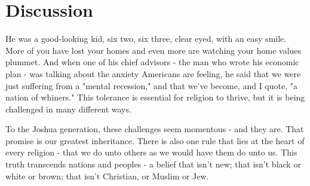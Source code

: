 \section{Discussion} \label{sec_discussion}

He was a good-looking kid, six two, six three, clear eyed, with an easy smile. More of you have lost your homes and even more are watching your home values plummet. And when one of his chief advisors - the man who wrote his economic plan - was talking about the anxiety Americans are feeling, he said that we were just suffering from a "mental recession," and that we've become, and I quote, "a nation of whiners." This tolerance is essential for religion to thrive, but it is being challenged in many different ways.

To the Joshua generation, these challenges seem momentous - and they are. That promise is our greatest inheritance. There is also one rule that lies at the heart of every religion - that we do unto others as we would have them do unto us. This truth transcends nations and peoples - a belief that isn't new; that isn't black or white or brown; that isn't Christian, or Muslim or Jew.
